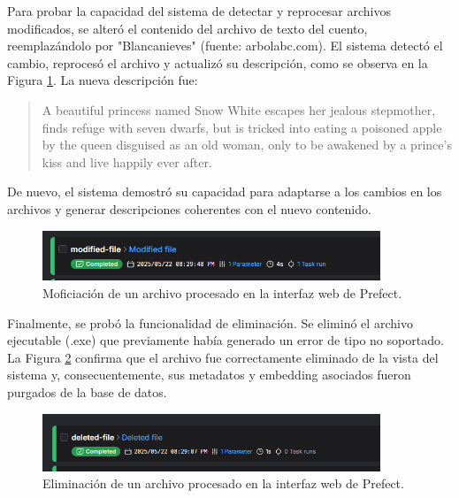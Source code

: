 Para probar la capacidad del sistema de detectar y reprocesar archivos modificados, se alteró el contenido del archivo de texto del cuento, reemplazándolo por "Blancanieves" (fuente: arbolabc.com). El sistema detectó el cambio, reprocesó el archivo y actualizó su descripción, como se observa en la Figura \ref{fig:result_web_modified_file}. La nueva descripción fue:

\begin{quote}
A beautiful princess named Snow White escapes her jealous stepmother, finds refuge with seven dwarfs, but is tricked into eating a poisoned apple by the queen disguised as an old woman, only to be awakened by a prince's kiss and live happily ever after.
\end{quote}

De nuevo, el sistema demostró su capacidad para adaptarse a los cambios en los archivos y generar descripciones coherentes con el nuevo contenido.

\begin{figure}[H]
\centering
\includegraphics[width=0.9\textwidth]{archivos/result_web_modified.png}
\caption[Modificación de un archivo procesado]{Moficiación de un archivo procesado en la interfaz web de Prefect.}
\label{fig:result_web_modified_file}
\end{figure}

Finalmente, se probó la funcionalidad de eliminación. Se eliminó el archivo ejecutable (.exe) que previamente había generado un error de tipo no soportado. La Figura \ref{fig:result_web_delete_file} confirma que el archivo fue correctamente eliminado de la vista del sistema y, consecuentemente, sus metadatos y embedding asociados fueron purgados de la base de datos.

\begin{figure}[H]
\centering
\includegraphics[width=0.9\textwidth]{archivos/result_web_delete.png}
\caption[Eliminación de un archivo procesado]{Eliminación de un archivo procesado en la interfaz web de Prefect.}
\label{fig:result_web_delete_file}
\end{figure}

